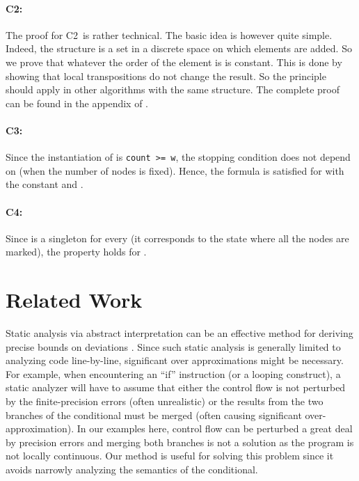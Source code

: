 \documentclass[copyright,creativecommons]{eptcs}
\newcommand{\Ctwo}{C2}
\newcommand{\Cthree}{C3}
\newcommand{\Cfour}{C4}
\begin{document}
\paragraph{\Ctwo: }
The proof for \Ctwo\ is rather technical. The basic idea is however
quite simple. Indeed, the  structure is a set in a discrete space
on which elements are added. So we prove that whatever the order of
the element is  is constant. This is done by showing that local
transpositions do not change the result. So the principle should
apply in other algorithms with the same  structure. 
The complete proof can be found in the appendix of \cite{gazeau12hal}.

\paragraph{\Cthree: }
Since the instantiation of  is \lstinline{count >= w}, 
the stopping condition does not depend on  (when the number of nodes  is fixed).
Hence, the formula is satisfied for  with the constant  and .

\paragraph{\Cfour: }
Since  is a singleton for every  (it corresponds to the state where all the nodes are marked), the property
holds for .

\section{Related Work}\label{sec:related}



Static analysis via abstract interpretation can be an effective method
for deriving precise bounds on deviations
\cite{goubault01sas,goubault11vmcai}.  Since such static analysis is
generally limited to analyzing code line-by-line, significant over
approximations might be necessary.  For example, when encountering an
``if'' instruction (or a looping construct), a static analyzer will
have to assume that either the control flow is not perturbed by the
finite-precision errors (often unrealistic) or the results from the
two branches of the conditional must be merged (often causing
significant over-approximation).  In our examples here, control flow
can be perturbed a great deal by precision errors and merging both
branches is not a solution as the program is not locally continuous.
Our method is useful for solving this problem since it avoids narrowly
analyzing the semantics of the conditional.
\end{document}
